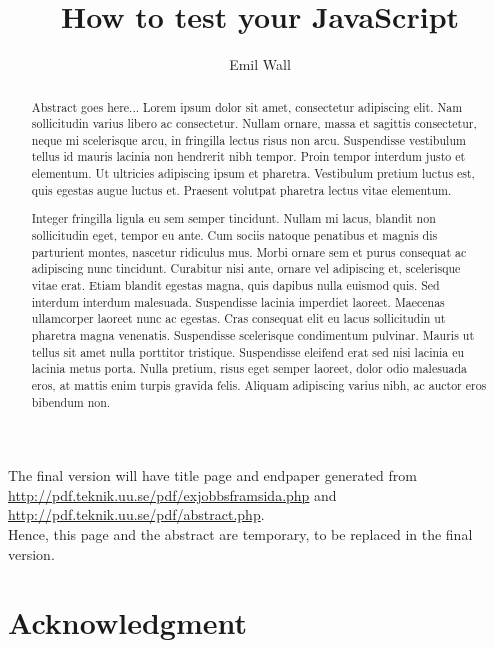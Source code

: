 \documentclass[11pt]{article}
\title{How to test your JavaScript}
\author{Emil Wall}
\begin{document}

\maketitle

\vspace{100pt}
The final version will have title page and endpaper generated from \\
\url{http://pdf.teknik.uu.se/pdf/exjobbsframsida.php} and \\
\url{http://pdf.teknik.uu.se/pdf/abstract.php}. \\
Hence, this page and the abstract are temporary, to be replaced in the final version.

\newpage
\clearpage\mbox{}\clearpage
\newpage

\begin{abstract}
Abstract goes here... Lorem ipsum dolor sit amet, consectetur adipiscing elit. Nam sollicitudin varius libero ac consectetur. Nullam ornare, massa et sagittis consectetur, neque mi scelerisque arcu, in fringilla lectus risus non arcu. Suspendisse vestibulum tellus id mauris lacinia non hendrerit nibh tempor. Proin tempor interdum justo et elementum. Ut ultricies adipiscing ipsum et pharetra. Vestibulum pretium luctus est, quis egestas augue luctus et. Praesent volutpat pharetra lectus vitae elementum.

Integer fringilla ligula eu sem semper tincidunt. Nullam mi lacus, blandit non sollicitudin eget, tempor eu ante. Cum sociis natoque penatibus et magnis dis parturient montes, nascetur ridiculus mus. Morbi ornare sem et purus consequat ac adipiscing nunc tincidunt. Curabitur nisi ante, ornare vel adipiscing et, scelerisque vitae erat. Etiam blandit egestas magna, quis dapibus nulla euismod quis. Sed interdum interdum malesuada. Suspendisse lacinia imperdiet laoreet. Maecenas ullamcorper laoreet nunc ac egestas. Cras consequat elit eu lacus sollicitudin ut pharetra magna venenatis. Suspendisse scelerisque condimentum pulvinar. Mauris ut tellus sit amet nulla porttitor tristique. Suspendisse eleifend erat sed nisi lacinia eu lacinia metus porta. Nulla pretium, risus eget semper laoreet, dolor odio malesuada eros, at mattis enim turpis gravida felis. Aliquam adipiscing varius nibh, ac auctor eros bibendum non.
\end{abstract}

\newpage
\clearpage\mbox{}\clearpage
\newpage

\section*{Acknowledgment}
\end{document}
